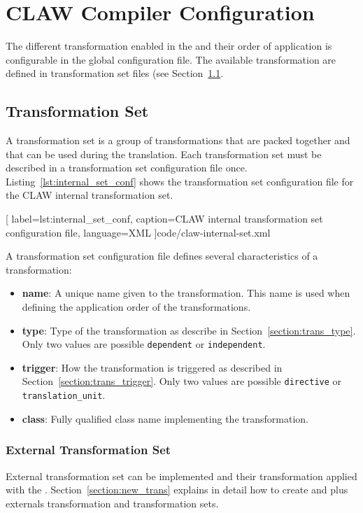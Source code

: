 \chapter{CLAW Compiler Configuration}
\label{chapter:configuration}

The different transformation enabled in the \clawfcomp and their order of 
application is configurable in the \clawfcomp global configuration file. The
available transformation are defined in transformation set files (see 
Section~\ref{section:conf_trans_set}.

\section{Transformation Set}
\label{section:conf_trans_set}
A transformation set is a group of transformations that are packed together and
that can be used during the translation. Each transformation set must be
described in a transformation set configuration file once. 
Listing~\ref{lst:internal_set_conf} shows the transformation set
configuration file for the CLAW internal transformation set.


  [
    label=lst:internal_set_conf,
    caption=CLAW internal transformation set configuration file,
    language=XML
  ]{code/claw-internal-set.xml}

A transformation set configuration file defines several characteristics of a
transformation:
\begin{itemize}
  \item \textbf{name}: A unique name given to the transformation. This name is 
        used when defining the application order of the transformations.
  \item \textbf{type}: Type of the transformation as describe in 
        Section~\ref{section:trans_type}. Only two values are possible
        \lstinline|dependent| or \lstinline|independent|.
  \item \textbf{trigger}: How the transformation is triggered as described in 
        Section~\ref{section:trans_trigger}. Only two values are possible
        \lstinline|directive| or \lstinline|translation_unit|.
  \item \textbf{class}: Fully qualified class name implementing the 
        transformation.
\end{itemize}

\subsection{External Transformation Set}
External transformation set can be implemented and their transformation applied
with the \clawfcomp. Section~\ref{section:new_trans} explains in detail how to
create and plus externals transformation and transformation sets. 

